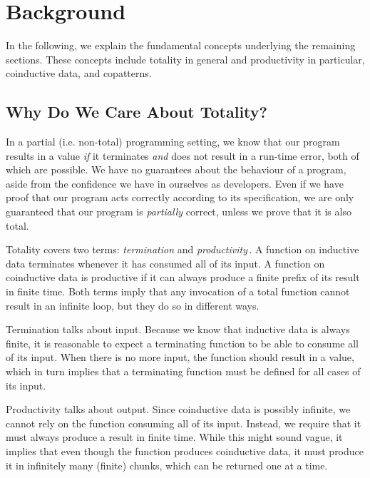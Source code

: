 \section{Background}
\label{sec:background}

In the following, we explain the fundamental concepts underlying the remaining sections. These concepts include totality in general and productivity in particular, coinductive data, and copatterns.

\subsection{Why Do We Care About Totality?}
In a partial (i.e. non-total) programming setting, we know that our program results in a value \emph{if} it terminates \emph{and} does not result in a run-time error, both of which are possible. We have no guarantees about the behaviour of a program, aside from the confidence we have in ourselves as developers. Even if we have proof that our program acts correctly according to its specification, we are only guaranteed that our program is \emph{partially} correct, unless we prove that it is also total.

Totality covers two terms: \emph{termination} and \emph{productivity}\,\citep{Turner04totalfunctional}. A function on inductive data terminates whenever it has consumed all of its input. A function on coinductive data is productive if it can always produce a finite prefix of its result in finite time. Both terms imply that any invocation of a total function cannot result in an infinite loop, but they do so in different ways. 

Termination talks about input. Because we know that inductive data is always finite, it is reasonable to expect a terminating function to be able to consume all of its input. When there is no more input, the function should result in a value, which in turn implies that a terminating function must be defined for all cases of its input. 

Productivity talks about output. Since coinductive data is possibly infinite, we cannot rely on the function consuming all of its input. Instead, we require that it must always produce a result in finite time. While this might sound vague, it implies that even though the function produces coinductive data, it must produce it in infinitely many (finite) chunks, which can be returned one at a time.

